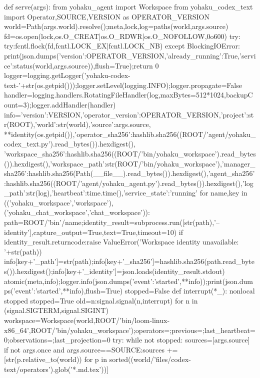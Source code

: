 def serve(args):
    from yohaku_agent import Workspace
    from yohaku_codex_text import Operator,SOURCE,VERSION as OPERATOR_VERSION
    world=Path(args.world).resolve();meta,lock,log=paths(world,args.source)
    fd=os.open(lock,os.O_CREAT|os.O_RDWR|os.O_NOFOLLOW,0o600)
    try:
        try:fcntl.flock(fd,fcntl.LOCK_EX|fcntl.LOCK_NB)
        except BlockingIOError:
            print(json.dumps({'version':OPERATOR_VERSION,'already_running':True,'service':status(world,args.source)}),flush=True);return 0
        logger=logging.getLogger('yohaku-codex-text-'+str(os.getpid()));logger.setLevel(logging.INFO);logger.propagate=False
        handler=logging.handlers.RotatingFileHandler(log,maxBytes=512*1024,backupCount=3);logger.addHandler(handler)
        info={'version':VERSION,'operator_version':OPERATOR_VERSION,'project':str(ROOT),'world':str(world),'source':args.source,
              **identity(os.getpid()),'operator_sha256':hashlib.sha256((ROOT/'agent/yohaku_codex_text.py').read_bytes()).hexdigest(),
              'workspace_sha256':hashlib.sha256((ROOT/'bin/yohaku_workspace').read_bytes()).hexdigest(),'workspace_path':str(ROOT/'bin/yohaku_workspace'),'manager_sha256':hashlib.sha256(Path(__file__).read_bytes()).hexdigest(),'agent_sha256':hashlib.sha256((ROOT/'agent/yohaku_agent.py').read_bytes()).hexdigest(),'log_path':str(log),'heartbeat':time.time(),'service_state':'running'}
        for name,key in (('yohaku_workspace','workspace'),('yohaku_chat_workspace','chat_workspace')):
            path=ROOT/'bin'/name;identity_result=subprocess.run([str(path),'--identity'],capture_output=True,text=True,timeout=10)
            if identity_result.returncode:raise ValueError('Workspace identity unavailable: '+str(path))
            info[key+'_path']=str(path);info[key+'_sha256']=hashlib.sha256(path.read_bytes()).hexdigest();info[key+'_identity']=json.loads(identity_result.stdout)
        atomic(meta,info);logger.info(json.dumps({'event':'started',**info}));print(json.dumps({'event':'started',**info}),flush=True)
        stopped=False
        def interrupt(*_):
            nonlocal stopped
            stopped=True
        old={n:signal.signal(n,interrupt) for n in (signal.SIGTERM,signal.SIGINT)}
        workspace=Workspace(world,ROOT/'bin/loom-linux-x86_64',ROOT/'bin/yohaku_workspace');operators={};previous={};last_heartbeat=0;observations={};last_projection=0
        try:
            while not stopped:
                sources=[args.source]
                if not args.once and args.source==SOURCE:sources += [str(p.relative_to(world)) for p in sorted((world/'files/codex-text/operators').glob('*.md.tex'))]
